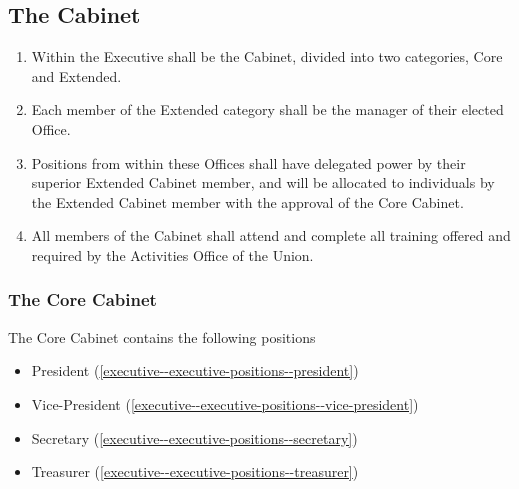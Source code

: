 \documentclass[parskip=half]{scrartcl}
\begin{document}
        \subsection{The Cabinet}
            \label{executive--cabinet}
            \begin{enumerate}
                \item Within the Executive shall be the Cabinet, divided into two categories, Core and Extended.
                \item Each member of the Extended category shall be the manager of their elected Office.
                \item Positions from within these Offices shall have delegated power by their superior Extended Cabinet member, and will be allocated to individuals by the Extended Cabinet member with the approval of the Core Cabinet.
                \item All members of the Cabinet shall attend and complete all training offered and required by the Activities Office of the Union.
            \end{enumerate}

            \subsubsection{The Core Cabinet}
                \label{executive--cabinet--core}
                
                The Core Cabinet contains the following positions
                \begin{itemize}
                    \item President (\ref{executive--executive-positions--president})
                    \item Vice-President (\ref{executive--executive-positions--vice-president})
                    \item Secretary (\ref{executive--executive-positions--secretary})
                    \item Treasurer (\ref{executive--executive-positions--treasurer})
                \end{itemize}
            
\end{document}
